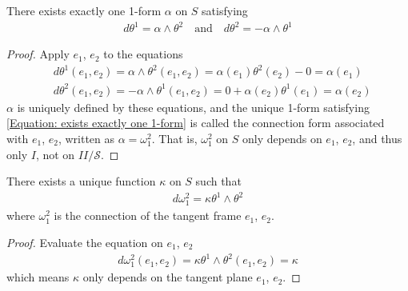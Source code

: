\documentclass[10pt]{article}
\begin{document}
            \begin{lemma}
                There exists exactly one 1-form $\alpha$ on $S$ satisfying
                \begin{equation}\label{Equation: exists exactly one 1-form}
                    \begin{aligned}
                        d\theta^1 = \alpha\wedge\theta^2 \quad\text{and}\quad d\theta^2 = -\alpha\wedge\theta^1
                    \end{aligned}
                \end{equation}
            \end{lemma}
            \begin{proof}
                Apply $e_1$, $e_2$ to the equations
                \begin{equation*}
                    \begin{aligned}
                        &d\theta^1(e_1,e_2) = \alpha\wedge\theta^2(e_1,e_2) = \alpha(e_1)\theta^2(e_2) - 0 = \alpha(e_1) \\
                        &d\theta^2(e_1,e_2) = -\alpha\wedge\theta^1(e_1,e_2) = 0 + \alpha(e_2)\theta^1(e_1) = \alpha(e_2)
                    \end{aligned}
                \end{equation*}
                $\alpha$ is uniquely defined by these equations, and the unique 1-form satisfying \eqref{Equation: exists exactly one 1-form} is called the connection form associated with $e_1$, $e_2$, written as $\alpha=\omega_1^2$. That is, $\omega_1^2$ on $S$ only depends on $e_1$, $e_2$, and thus only $I$, not on $II/\mathcal{S}$.
            \end{proof}
            \begin{lemma}
                There exists a unique function $\kappa$ on $S$ such that 
                \begin{equation*}
                    \begin{aligned}
                        d\omega_1^2 = \kappa\theta^1\wedge\theta^2
                    \end{aligned}
                \end{equation*}
                where $\omega_1^2$ is the connection of the tangent frame $e_1$, $e_2$.
            \end{lemma}
            \begin{proof}
                Evaluate the equation on $e_1$, $e_2$
                \begin{equation*}
                    \begin{aligned}
                        d\omega_1^2(e_1,e_2) = \kappa\theta^1\wedge\theta^2(e_1,e_2) = \kappa
                    \end{aligned}
                \end{equation*}
                which means $\kappa$ only depends on the tangent plane $e_1$, $e_2$.
            \end{proof}
\end{document}
